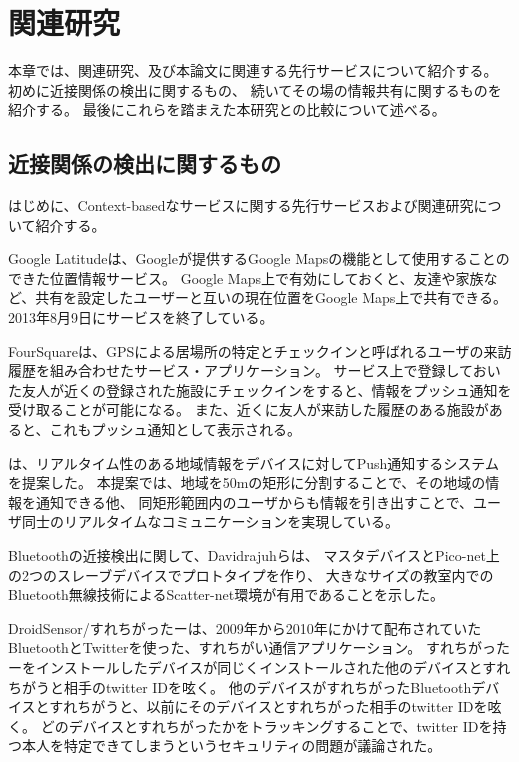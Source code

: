 \chapter{関連研究}\label{chap:related}

本章では、関連研究、及び本論文に関連する先行サービスについて紹介する。
初めに近接関係の検出に関するもの、
続いてその場の情報共有に関するものを紹介する。
最後にこれらを踏まえた本研究との比較について述べる。

\newpage

\section{近接関係の検出に関するもの}

はじめに、Context-basedなサービスに関する先行サービスおよび関連研究について紹介する。

Google Latitude\cite{latitude}は、Googleが提供するGoogle Mapsの機能として使用することのできた位置情報サービス。
Google Maps上で有効にしておくと、友達や家族など、共有を設定したユーザーと互いの現在位置をGoogle Maps上で共有できる。
2013年8月9日にサービスを終了している。

FourSquare\cite{foursquare}は、GPSによる居場所の特定とチェックインと呼ばれるユーザの来訪履歴を組み合わせたサービス・アプリケーション。
サービス上で登録しておいた友人が近くの登録された施設にチェックインをすると、情報をプッシュ通知を受け取ることが可能になる。
また、近くに友人が来訪した履歴のある施設があると、これもプッシュ通知として表示される。

\cite{槙島量:2010-03-08}は、リアルタイム性のある地域情報をデバイスに対してPush通知するシステムを提案した。
本提案では、地域を50mの矩形に分割することで、その地域の情報を通知できる他、
同矩形範囲内のユーザからも情報を引き出すことで、ユーザ同士のリアルタイムなコミュニケーションを実現している。

Bluetoothの近接検出に関して、Davidrajuh\cite{Davidrajuh:2009:EPB:1523492.1523495}らは、
マスタデバイスとPico-net上の2つのスレーブデバイスでプロトタイプを作り、
大きなサイズの教室内でのBluetooth無線技術によるScatter-net環境が有用であることを示した。

DroidSensor/すれちがったー\cite{すれちがったー}は、2009年から2010年にかけて配布されていたBluetoothとTwitterを使った、すれちがい通信アプリケーション。
すれちがったーをインストールしたデバイスが同じくインストールされた他のデバイスとすれちがうと相手のtwitter IDを呟く。
他のデバイスがすれちがったBluetoothデバイスとすれちがうと、以前にそのデバイスとすれちがった相手のtwitter IDを呟く。
どのデバイスとすれちがったかをトラッキングすることで、twitter IDを持つ本人を特定できてしまうというセキュリティの問題が議論された。


